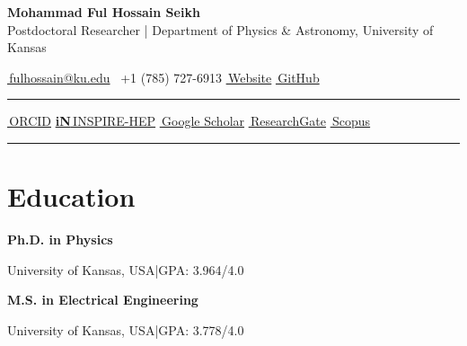 \documentclass[10pt,letterpaper]{report}
\newcommand{\profilelink}[3]{\href{#1}{#2\,#3}}
\newcommand{\cvdate}[1]{{\normalfont\itshape\color{Muted}(#1)}}
\newcommand{\cvdated}[2]{#1\enspace\cvdate{#2}\par\nobreak}
\begin{document}
\fontsize{10.8}{12.9}\selectfont


\begin{center}
{\fontsize{21}{23}\selectfont\bfseries\color{Primary} Mohammad Ful Hossain Seikh}\\[4pt]
{\normalsize Postdoctoral Researcher \;|\; Department of Physics \& Astronomy, University of Kansas}\\[4pt]

{\small
\profilelink{mailto:fulhossain@ku.edu}{\faEnvelope}{fulhossain@ku.edu}\enspace\textbar\enspace
\textcolor{Primary}{\faPhone}\, +1 (785) 727-6913\enspace\textbar\enspace
\profilelink{https://mohammad-neutrino.github.io/}{\faGlobe}{Website}\enspace\textbar\enspace
\profilelink{https://github.com/Mohammad-Neutrino}{\faGithub}{GitHub}\par}

\vspace{5pt}
{\color{Rule}\hrule height 0.4pt}
\vspace{5pt}

{\small
\profilelink{https://orcid.org/0000-0002-4464-7354}{\aiOrcid}{ORCID}\quad
\profilelink{https://inspirehep.net/authors/2014116}{{\sffamily\bfseries iN}}{INSPIRE-HEP}\quad
\profilelink{https://scholar.google.com/citations?user=dSwfpWQAAAAJ}{\aiGoogleScholar}{Google Scholar}\quad
\profilelink{https://www.researchgate.net/profile/Mohammad-Ful-Hossain-Seikh}{\aiResearchGate}{ResearchGate}\quad
\profilelink{https://www.scopus.com/authid/detail.uri?authorId=57426893600}{\aiScopus}{Scopus}\par}
\vspace{5pt}
{\color{Rule}\hrule height 0.4pt}
\vspace{5pt}
\end{center}




\section*{Education}

\begingroup
\setlength{\leftskip}{1.5em}
\setlength{\parindent}{0pt}

\cvdated{\textbf{Ph.D. in Physics}}{2020--2026}
University of Kansas, USA\enspace|\enspace GPA: 3.964/4.0\par\vspace{3pt}

\cvdated{\textbf{M.S. in Electrical Engineering}}{2024--2025}
University of Kansas, USA\enspace|\enspace GPA: 3.778/4.0\par\vspace{3pt}
\end{document}
